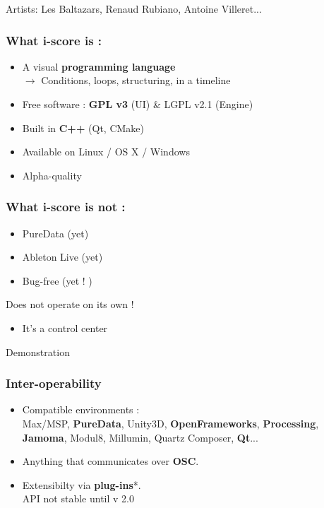 \documentclass{beamer}
\begin{document}
\begin{frame}
    {\large Artists: Les Baltazars, Renaud Rubiano, Antoine Villeret...}
    
\end{frame}

    \begin{frame}
        \frametitle{What i-score is : }
        \Large
        \begin{itemize}        
        \item<1-> A visual \textbf{programming language} \\ $\rightarrow$ Conditions, loops, structuring, in a timeline
        \item<1-> Free software : \textbf{GPL v3 }(UI) \& LGPL v2.1 (Engine)
        \item<2-> Built in \textbf{C++} (Qt, CMake)        
        \item<2-> Available on Linux / OS X / Windows        
        \item<3-> Alpha-quality 
        \end{itemize}
    \end{frame}
    \begin{frame}
        \frametitle{What i-score is not : }
        \Large
        \begin{itemize} [<+->]
            \item PureData (yet)
            \item Ableton Live (yet)       
            \item Bug-free (yet ! )
        \end{itemize}
        \vspace{2em}
        
        \pause[\thebeamerpauses]
        \Huge Does not operate on its own !
        \Large
        \begin{itemize} 
            \item  It's a control center
        \end{itemize}
    \end{frame}
    
    \begin{frame}
    	\centering \Huge Demonstration
    \end{frame}
    
    \begin{frame}
        \frametitle{Inter-operability}
        \Large
        \begin{itemize}
        	\item Compatible environments :\\
	        	 Max/MSP, \textbf{PureData}, Unity3D, \textbf{OpenFrameworks}, \textbf{Processing}, \textbf{Jamoma}, Modul8, Millumin, Quartz Composer, \textbf{Qt}... 
	        \item Anything that communicates over \textbf{OSC}.
	        \item Extensibilty via \textbf{plug-ins}*. \\ {\small *API not stable until v 2.0}
        \end{itemize}
        
    \end{frame}
    
\end{document}
